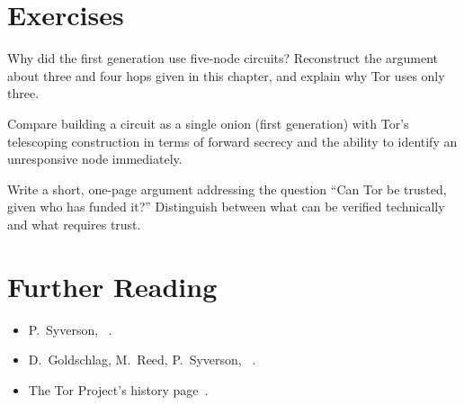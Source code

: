 \section*{Exercises}

\begin{esercizio}[1]\label{es:03-cinque}
Why did the first generation use five-node circuits? Reconstruct the argument about three and four hops given in this chapter, and explain why Tor uses only three.
\end{esercizio}

\begin{esercizio}[2]\label{es:03-cipolla}
Compare building a circuit as a single onion (first generation) with Tor's telescoping construction in terms of forward secrecy and the ability to identify an unresponsive node immediately.
\end{esercizio}

\begin{esercizio}[2]\label{es:03-fiducia}
Write a short, one-page argument addressing the question \enquote{Can Tor be trusted, given who has funded it?} Distinguish between what can be verified technically and what requires trust.
\end{esercizio}

\section*{Further Reading}
\begin{itemize}
  \item P.~Syverson, ~\cite{syverson2011peel}.
  \item D.~Goldschlag, M.~Reed, P.~Syverson, ~\cite{goldschlag1996hiding}.
  \item The Tor Project's history page~\cite{torhistory}.
\end{itemize}
